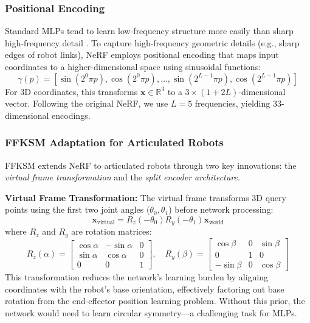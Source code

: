 \documentclass[12pt,a4paper,oneside]{report}
\begin{document}
\subsubsection{Positional Encoding}

Standard MLPs tend to learn low-frequency structure more easily than sharp high-frequency detail \cite{rahaman2019spectral}. To capture high-frequency geometric details (e.g., sharp edges of robot links), NeRF employs positional encoding that maps input coordinates to a higher-dimensional space using sinusoidal functions:
\begin{equation}
\gamma(p) = [\sin(2^0 \pi p), \cos(2^0 \pi p), \ldots, \sin(2^{L-1} \pi p), \cos(2^{L-1} \pi p)]
\end{equation}
For 3D coordinates, this transforms $\mathbf{x} \in \mathbb{R}^3$ to a $3 \times (1 + 2L)$-dimensional vector. Following the original NeRF, we use $L = 5$ frequencies, yielding 33-dimensional encodings.

\subsubsection{FFKSM Adaptation for Articulated Robots}

FFKSM extends NeRF to articulated robots through two key innovations: the \textit{virtual frame transformation} and the \textit{split encoder architecture}.

\textbf{Virtual Frame Transformation:} The virtual frame transforms 3D query points using the first two joint angles ($\theta_0, \theta_1$) before network processing:
\begin{equation}
\mathbf{x}_{\text{virtual}} = R_z(-\theta_0) R_y(-\theta_1) \mathbf{x}_{\text{world}}
\end{equation}
where $R_z$ and $R_y$ are rotation matrices:
\begin{equation}
R_z(\alpha) = \begin{bmatrix}
\cos\alpha & -\sin\alpha & 0 \\
\sin\alpha & \cos\alpha & 0 \\
0 & 0 & 1
\end{bmatrix}, \quad
R_y(\beta) = \begin{bmatrix}
\cos\beta & 0 & \sin\beta \\
0 & 1 & 0 \\
-\sin\beta & 0 & \cos\beta
\end{bmatrix}
\end{equation}
This transformation reduces the network's learning burden by aligning coordinates with the robot's base orientation, effectively factoring out base rotation from the end-effector position learning problem. Without this prior, the network would need to learn circular symmetry---a challenging task for MLPs.
\end{document}
